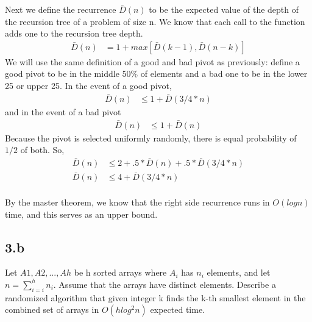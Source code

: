\documentclass[11pt]{article}
\begin{document}
\begin{solution}
Next we define the recurrence $\bar{D}(n)$ to be the expected value of the depth of the recursion tree of a problem of size n. We know that each call to the function adds one to the recursion tree depth.
\begin{align*}
\bar{D}(n) &= 1 + max[\bar{D}(k-1), \bar{D}(n-k)]
\end{align*}
We will use the same definition of a good and bad pivot as previously: define a good pivot to be in the middle 50\% of elements and a bad one to be in the lower 25 or upper 25.  In the event of a good pivot,
\begin{align*}
\bar{D}(n) &\leq 1 + \bar{D}(3/4 * n)
\end{align*}
and in the event of a bad pivot
\begin{align*}
\bar{D}(n) &\leq 1 + \bar{D}(n)
\end{align*}
Because the pivot is selected uniformly randomly, there is equal probability of $1/2$ of both. So,
\begin{align*}
\bar{D}(n) &\leq 2 + .5*\bar{D}(n) + .5*\bar{D}(3/4 * n) \\
\bar{D}(n) &\leq 4 + \bar{D}(3/4 * n)
\end{align*}
\\ By the master theorem, we know that the right side recurrence runs in $O(logn)$ time, and this serves as an upper bound.

\end{solution}

\clearpage



\subsection *{3.b} Let $A1, A2, . . . , Ah$ be h sorted arrays where $A_i$ has $n_i$ elements, and let $n = \sum_{i=i}^{h} n_i$. Assume that the arrays have distinct elements. Describe a randomized algorithm that given integer k finds the k-th smallest element in the combined set of arrays in $O(h log^2 n)$ expected time.
\end{document}
